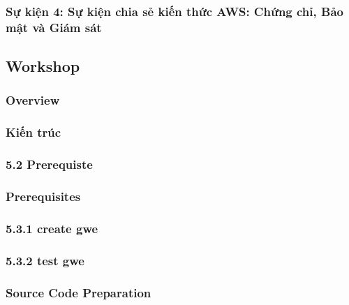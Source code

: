 \subsubsection{Sự kiện 4: Sự kiện chia sẻ kiến thức AWS: Chứng chỉ, Bảo mật và Giám sát}


\newpage

\subsection{Workshop}

\subsubsection{Overview}


\subsubsection{Kiến trúc}


\subsubsection{5.2 Prerequiste}


\subsubsection{Prerequisites}




\subsubsection{5.3.1 create gwe}


\subsubsection{5.3.2 test gwe}




\subsubsection{Source Code Preparation}


